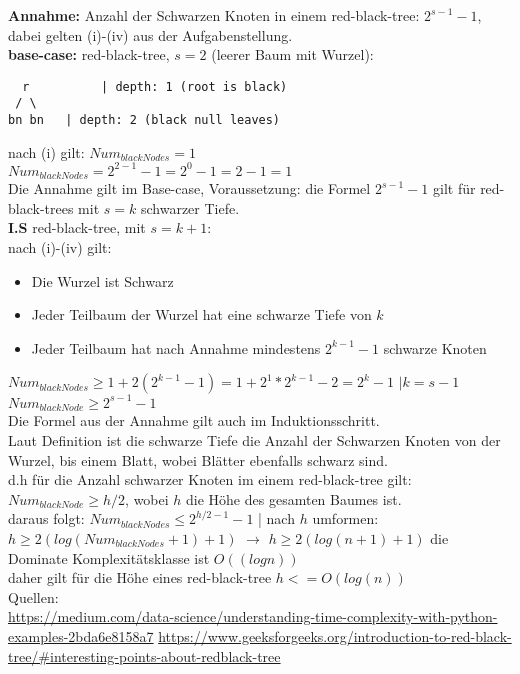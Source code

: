 \textbf{Annahme:} Anzahl der Schwarzen Knoten in einem red-black-tree: $2^{s-1}-1$, dabei gelten (i)-(iv) aus der Aufgabenstellung.\\
\textbf{base-case:} red-black-tree, $s=2$ (leerer Baum mit Wurzel):

\begin{verbatim}
  r 		 | depth: 1 (root is black)
 / \
bn bn 	| depth: 2 (black null leaves)
\end{verbatim}
nach (i) gilt: $Num_{blackNodes}=1$\\
$Num_{blackNodes}=2^{2-1}-1=2^{0}-1=2-1=1$\\

Die Annahme gilt im Base-case, Voraussetzung: die Formel $2^{s-1}-1$ gilt für red-black-trees mit $s=k$ schwarzer Tiefe.\\

\textbf{I.S} red-black-tree, mit $s=k+1:$\\
nach (i)-(iv) gilt:
\begin{itemize}
	\item Die Wurzel ist Schwarz
	\item Jeder Teilbaum der Wurzel hat eine schwarze Tiefe von $k$
	\item Jeder Teilbaum hat nach Annahme mindestens $2^{k-1}-1$ schwarze Knoten
\end{itemize}
$Num_{blackNodes} \geq 1+2(2^{k-1}-1)=1+2^{1} * 2^{k-1} -2 = 2^k -1$ $| k = s-1$\\
$Num_{blackNode} \geq 2^{s-1}-1$\\

Die Formel aus der Annahme gilt auch im Induktionsschritt. \\

Laut Definition ist die schwarze Tiefe die Anzahl der Schwarzen Knoten von der Wurzel, bis einem Blatt, wobei Blätter ebenfalls schwarz sind.\\
d.h für die Anzahl schwarzer Knoten im einem red-black-tree gilt: $Num_{blackNode} \geq h/2$, wobei $h$ die Höhe des gesamten Baumes ist.\\
daraus folgt: $Num_{blackNodes} \leq 2^{h/2 -1}-1$ | nach $h$ umformen:\\
$h \geq 2(log(Num_{blackNodes} +1)+1)$ $\rightarrow$ $h \geq 2(log(n +1)+1)$ die Dominate Komplexitätsklasse ist $O((log n))$ \\
daher gilt für die Höhe eines red-black-tree $h<= O(log(n))$\\

\noindent
Quellen:\\
\url{https://medium.com/data-science/understanding-time-complexity-with-python-examples-2bda6e8158a7}
\url{https://www.geeksforgeeks.org/introduction-to-red-black-tree/#interesting-points-about-redblack-tree}





















